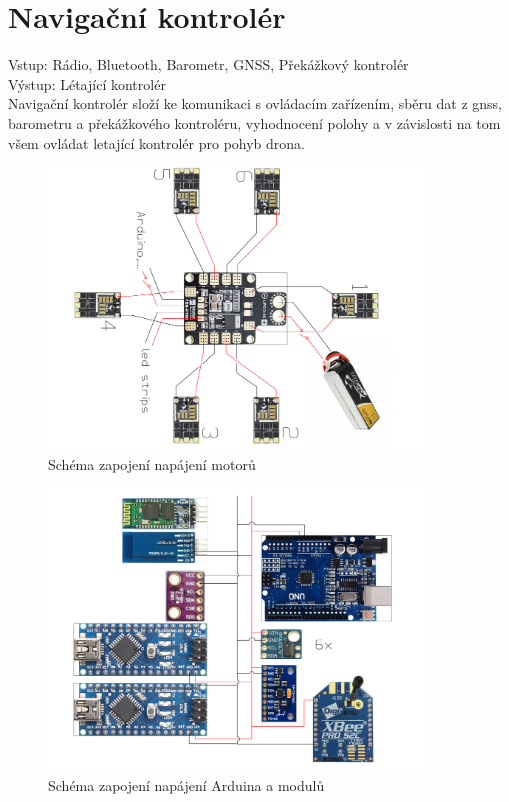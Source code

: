 \section{Navigační kontrolér} 
Vstup: Rádio, Bluetooth, Barometr, GNSS, Překážkový kontrolér\\
Výstup: Létající kontrolér\\

Navigační kontrolér složí ke komunikaci s ovládacím zařízením, sběru dat z gnss, barometru a překážkového kontroléru, vyhodnocení polohy a v závislosti na tom všem ovládat letající kontrolér pro pohyb drona.\\

\begin{figure}[h]
	\centering
	\includegraphics[width=10cm, angle=90]{pictures/pdb_com.pdf}
	\caption{Schéma zapojení napájení motorů}
\end{figure}

\begin{figure}[h]
	\centering
	\includegraphics[width=10cm]{pictures/pdb_ardu.pdf}
	\caption{Schéma zapojení napájení Arduina a modulů}
\end{figure}

